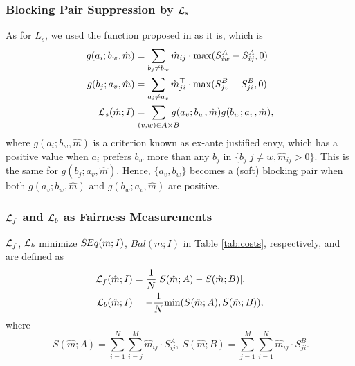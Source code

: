 \subsubsection{Blocking Pair Suppression by \texorpdfstring{${\mathcal L}_s$}{Ls}}
As for $L_s$, we used the function proposed in \cite{harvard2019} as it is, which is 
\begin{equation}
\begin{split}
g(a_i;b_w,\hat{m}) &= \sum_{b_j\neq b_w}\hat{m}_{ij}\cdot \max(S^A_{iw}-S^A_{ij},0) \\ 
g(b_j;a_v,\hat{m}) &= \sum_{a_i\neq a_v}\hat{m}^{\top}_{ji}\cdot \max(S^B_{jv}-S^B_{ji},0) \\ 
{\mathcal L}_s(\hat{m};I) &= \hspace{-1.0em}\sum_{(v,w)\in A \times B}\hspace{-1.0em}g(a_v;b_w,\hat{m})g(b_w;a_v,\hat{m}), 
\end{split}
\end{equation}
where $g(a_i;b_w,\hat{m})$ is a criterion known as ex-ante justified envy, which has a positive value when $a_i$ prefers $b_w$ more than any $b_j$ in $\{b_j|j\neq w,\hat{m}_{ij}>0\}$. This is the same for $g(b_j;a_v,\hat{m})$.
Hence, $\{a_v,b_w\}$ becomes a (soft) blocking pair when both $g(a_v;b_w,\hat{m})$ and $g(b_w;a_v,\hat{m})$ are positive. 

\subsubsection{\texorpdfstring{${\mathcal L}_{f}$ and ${\mathcal L}_{b}$}{Lf and Lb} as Fairness Measurements}
${\mathcal L}_f$, ${\mathcal L}_b$ minimize $S\hspace{-0.1em}Eq(m;I)$, $Bal(m;I)$ in Table \ref{tab:costs}, respectively, and are defined as
\begin{align}
{\mathcal L}_f(\hat{m};I) &= \frac{1}{N}|S(\hat{m};A) - S(\hat{m};B) |,\\
{\mathcal L}_b(\hat{m};I) &= -\frac{1}{N}{\rm min} (S(\hat{m};A),S(\hat{m};B)),
\end{align}
where
\begin{equation}
~ S(\hat{m};A) = \sum_{i=1}^{N}\sum_{i=j}^{M} \hat{m}_{ij} \cdot {S^{A}_{ij}},~ S(\hat{m};B) = \sum_{j=1}^{M}\sum_{i=1}^{N} \hat{m}_{ij} \cdot {S^{B}_{ji}}.
\end{equation}


